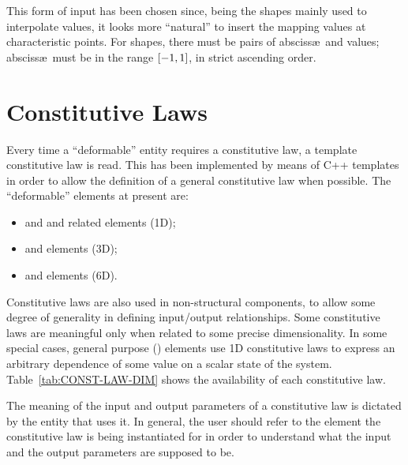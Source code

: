 This form of input has been chosen since, being the shapes mainly used to
interpolate values, it looks more ``natural'' to insert the mapping values
at characteristic points.
For  shapes, there must be 
 pairs of absciss\ae\ and values; absciss\ae\
must be in the range $\left[ -1,1 \right]$, in strict ascending order.


\section{Constitutive Laws}\label{sec:CONSTITUTIVE-LAWS}
Every time a ``deformable'' entity requires a constitutive law, a template
constitutive law is read. This has been implemented by means of C++
templates in order to allow the definition of a general constitutive law
when possible.
The ``deformable'' elements at present are:
\begin{itemize}
\item {}
	and
	and related elements (1D);
\item {}
	and 
	elements (3D);
\item {}
	and \htmlref{\kw{beam}}{sec:EL:BEAM}
	elements (6D).
\end{itemize}

Constitutive laws are also used in non-structural components,
to allow some degree of generality in defining input/output relationships.
Some constitutive laws are meaningful only when related to some precise
dimensionality. 
In some special cases, general purpose ()
elements use 1D constitutive laws to express an arbitrary dependence
of some value on a scalar state of the system.
Table~\ref{tab:CONST-LAW-DIM} shows the availability of each constitutive law.

The meaning of the input and output parameters of a constitutive law
is dictated by the entity that uses it.
In general, the user should refer to the element the constitutive law
is being instantiated for in order to understand what the input
and the output parameters are supposed to be.

